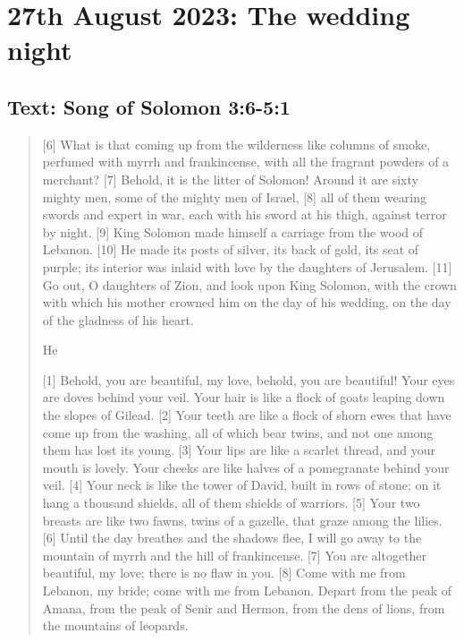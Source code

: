 \setcounter{figure}{0}

\section{27th August 2023: The wedding night}
\subsection*{Text: Song of Solomon 3:6-5:1}
  \begin{quote}
    [6] What is that coming up from the wilderness
        like columns of smoke,
    perfumed with myrrh and frankincense,
        with all the fragrant powders of a merchant?
    [7] Behold, it is the litter of Solomon!
    Around it are sixty mighty men,
        some of the mighty men of Israel,
    [8] all of them wearing swords
        and expert in war,
    each with his sword at his thigh,
        against terror by night.
    [9] King Solomon made himself a carriage
        from the wood of Lebanon.
    [10] He made its posts of silver,
        its back of gold, its seat of purple;
    its interior was inlaid with love
        by the daughters of Jerusalem.
    [11] Go out, O daughters of Zion,
        and look upon King Solomon,
    with the crown with which his mother crowned him
        on the day of his wedding,
        on the day of the gladness of his heart.


        He

    [1] Behold, you are beautiful, my love,
        behold, you are beautiful!
    Your eyes are doves
        behind your veil.
    Your hair is like a flock of goats
        leaping down the slopes of Gilead.
    [2] Your teeth are like a flock of shorn ewes
        that have come up from the washing,
    all of which bear twins,
        and not one among them has lost its young.
    [3] Your lips are like a scarlet thread,
        and your mouth is lovely.
    Your cheeks are like halves of a pomegranate
        behind your veil.
    [4] Your neck is like the tower of David,
        built in rows of stone;
    on it hang a thousand shields,
        all of them shields of warriors.
    [5] Your two breasts are like two fawns,
        twins of a gazelle,
        that graze among the lilies.
    [6] Until the day breathes
        and the shadows flee,
    I will go away to the mountain of myrrh
        and the hill of frankincense.
    [7] You are altogether beautiful, my love;
        there is no flaw in you.
    [8] Come with me from Lebanon, my bride;
        come with me from Lebanon.
    Depart from the peak of Amana,
        from the peak of Senir and Hermon,
    from the dens of lions,
        from the mountains of leopards.



\end{quote}
